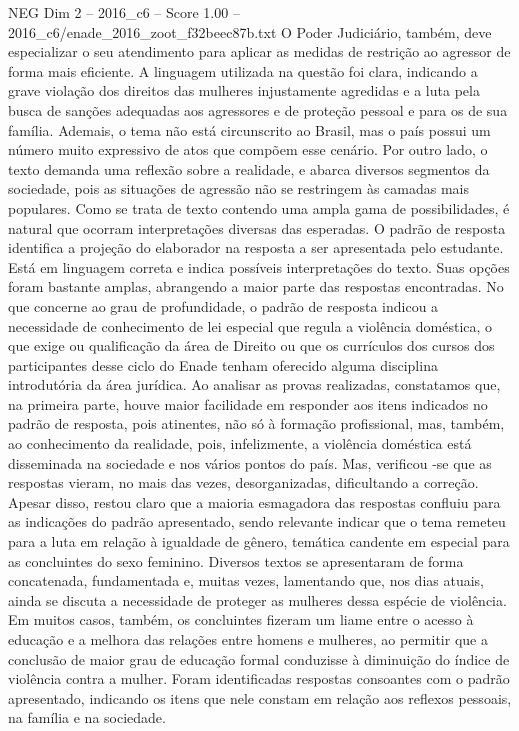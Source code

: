 \begin{textsample}{NEG Dim 2 – 2016\_c6 – Score 1.00 – 2016\_c6/enade\_2016\_zoot\_f32beec87b.txt}
O Poder Judiciário, também, deve especializar o seu atendimento para aplicar as medidas de restrição ao agressor de forma mais eficiente.
A linguagem utilizada na questão foi clara, indicando a grave violação dos direitos das mulheres injustamente agredidas e a luta pela busca de sanções adequadas aos agressores e de proteção pessoal e para os de sua família.
Ademais, o tema não está circunscrito ao Brasil, mas o país possui um número muito expressivo de atos que compõem esse cenário.
Por outro lado, o texto demanda uma reflexão sobre a realidade, e abarca diversos segmentos da sociedade, pois as situações de agressão não se restringem às camadas mais populares.
Como se trata de texto contendo uma ampla gama de possibilidades, é natural que ocorram interpretações diversas das esperadas.
O padrão de resposta identifica a projeção do elaborador na resposta a ser apresentada pelo estudante.
Está em linguagem correta e indica possíveis interpretações do texto.
Suas opções foram bastante amplas, abrangendo a maior parte das respostas encontradas.
No que concerne ao grau de profundidade, o padrão de resposta indicou a necessidade de conhecimento de lei especial que regula a violência doméstica, o que exige ou qualificação da área de Direito ou que os currículos dos cursos dos participantes desse ciclo do Enade tenham oferecido alguma disciplina introdutória da área jurídica.
Ao analisar as provas realizadas, constatamos que, na primeira parte, houve maior facilidade em responder aos itens indicados no padrão de resposta, pois atinentes, não só à formação profissional, mas, também, ao conhecimento da realidade, pois, infelizmente, a violência doméstica está disseminada na sociedade e nos vários pontos do país.
Mas, verificou -se que as respostas vieram, no mais das vezes, desorganizadas, dificultando a correção.
Apesar disso, restou claro que a maioria esmagadora das respostas confluiu para as indicações do padrão apresentado, sendo relevante indicar que o tema remeteu para a luta em relação à igualdade de gênero, temática candente em especial para as concluintes do sexo feminino.
Diversos textos se apresentaram de forma concatenada, fundamentada e, muitas vezes, lamentando que, nos dias atuais, ainda se discuta a necessidade de proteger as mulheres dessa espécie de violência.
Em muitos casos, também, os concluintes fizeram um liame entre o acesso à educação e a melhora das relações entre homens e mulheres, ao permitir que a conclusão de maior grau de educação formal conduzisse à diminuição do índice de violência contra a mulher.
Foram identificadas respostas consoantes com o padrão apresentado, indicando os itens que nele constam em relação aos reflexos pessoais, na família e na sociedade.

\end{textsample}

